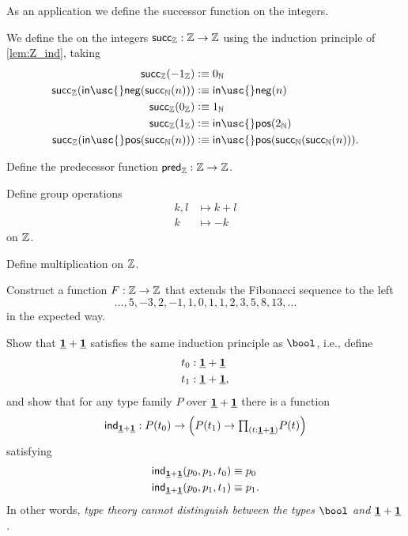 As an application we define the successor function on the integers.

\begin{defn}
We define the  on the integers $\mathsf{succ}_\mathbb{Z}:\mathbb{Z}\to\mathbb{Z}$ using the induction principle of \cref{lem:Z_ind}, taking
\begin{align*}
\mathsf{succ}_\Z(-1_\Z) & \defeq 0_\N \\
\mathsf{succ}_\Z(\mathsf{in\usc{}neg}(\mathsf{succ}_\N(n))) & \defeq \mathsf{in\usc{}neg}(n) \\
\mathsf{succ}_\Z(0_\Z) & \defeq 1_\N \\
\mathsf{succ}_\Z(1_\Z) & \defeq \mathsf{in\usc{}pos}(2_\N) \\
\mathsf{succ}_\Z(\mathsf{in\usc{}pos}(\mathsf{succ}_\N(n))) & \defeq \mathsf{in\usc{}pos}(\mathsf{succ}_\N(\mathsf{succ}_\N(n))).
\end{align*}
\end{defn}

\begin{exercises}
\item \label{ex:int_pred}Define the predecessor function $\mathsf{pred}_\mathbb{Z}:\mathbb{Z}\to \mathbb{Z}$.
\item \label{ex:int_group_ops}Define group operations
  \begin{align*}
    k,l & \mapsto k+l \\
    k & \mapsto -k
  \end{align*}
  on $\mathbb{Z}$.
\item Define multiplication on $\mathbb{Z}$.
\item Construct a function $F:\mathbb{Z}\to\mathbb{Z}$ that extends the Fibonacci sequence to the left
  \begin{equation*}
    \ldots,5,-3,2,-1,1,0,1,1,2,3,5,8,13,\ldots
  \end{equation*}
  in the expected way.
\item \label{ex:one_plus_one} Show that $\underline{\mathbf{1}}+\underline{\mathbf{1}}$ satisfies the same induction principle as $\bool$, i.e., define
  \begin{align*}
    t_0 & : \underline{\mathbf{1}} + \underline{\mathbf{1}} \\
    t_1 & : \underline{\mathbf{1}} + \underline{\mathbf{1}},
  \end{align*}
  and show that for any type family $P$ over $\underline{\mathbf{1}}+\underline{\mathbf{1}}$ there is a function
  \begin{align*}
    \ind{\unit+\unit}:P(t_0)\to \Big(P(t_1)\to \prd{t:\unit+\unit}P(t)\Big)
  \end{align*}
  satisfying
  \begin{align*}
    \mathsf{ind}_{\underline{\mathbf{1}}+\underline{\mathbf{1}}}(p_0,p_1,t_0) & \equiv p_0 \\
    \mathsf{ind}_{\underline{\mathbf{1}}+\underline{\mathbf{1}}}(p_0,p_1,t_1) & \equiv p_1.
  \end{align*}
  In other words, \emph{type theory cannot distinguish between the types $\bool$ and $\underline{\mathbf{1}}+\underline{\mathbf{1}}$.}
\end{exercises}
